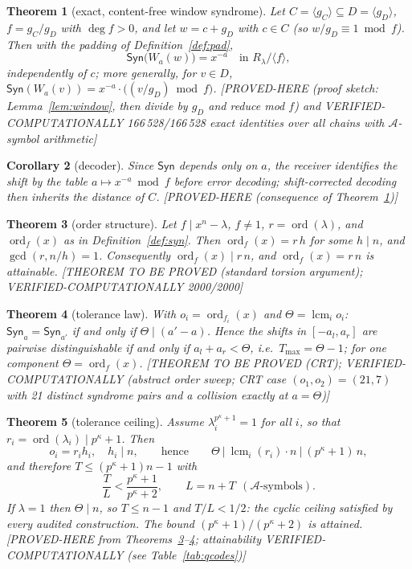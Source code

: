 \documentclass[11pt]{article}
\newtheorem{theorem}{Theorem}[section]
\newtheorem{corollary}[theorem]{Corollary}
\theoremstyle{definition}
\theoremstyle{remark}
\theoremstyle{plain}
\newcommand{\Aalg}{\mathcal{A}}
\newcommand{\Rlam}{R_{\lambda}}
\newcommand{\ord}{\operatorname{ord}}
\newcommand{\lcm}{\operatorname{lcm}}
\newcommand{\Tol}{T}
\newcommand{\Th}{\Theta}
\newcommand{\Syn}{\mathsf{Syn}}
\newcommand{\status}[1]{\textnormal{\footnotesize[#1]}}
\begin{document}
\begin{theorem}[exact, content-free window syndrome]\label{thm:synd}
Let $C=\langle g_C\rangle\subseteq D=\langle g_D\rangle$, $f=g_C/g_D$ with $\deg f>0$, and let
$w=c+g_D$ with $c\in C$ (so $w/g_D\equiv1\bmod f$). Then with the padding of
Definition~\ref{def:pad},
\[
\Syn\big(W_a(w)\big)=x^{-a}\quad\text{in }\Rlam/\langle f\rangle,
\]
independently of $c$; more generally, for $v\in D$,
$\Syn(W_a(v))=x^{-a}\cdot\big((v/g_D)\bmod f\big)$.
\status{PROVED-HERE (proof sketch: Lemma~\ref{lem:window}, then divide by $g_D$ and reduce
mod $f$) and VERIFIED-COMPUTATIONALLY 166\,528/166\,528 exact identities over all chains with
$\Aalg$-symbol arithmetic}
\end{theorem}

\begin{corollary}[decoder]\label{cor:decoder}
Since $\Syn$ depends only on $a$, the receiver identifies the shift by the table
$a\mapsto x^{-a}\bmod f$ before error decoding; shift-corrected decoding then inherits the
distance of $C$.
\status{PROVED-HERE (consequence of Theorem~\ref{thm:synd})}
\end{corollary}

\begin{theorem}[order structure]\label{thm:order}
Let $f\mid x^n-\lambda$, $f\ne1$, $r=\ord(\lambda)$, and $\ord_f(x)$ as in
Definition~\ref{def:syn}. Then $\ord_f(x)=r\,h$ for some $h\mid n$, and
$\gcd(r,n/h)=1$. Consequently $\ord_f(x)\mid r\,n$, and $\ord_f(x)=r\,n$ is attainable.
\status{THEOREM TO BE PROVED (standard torsion argument); VERIFIED-COMPUTATIONALLY 2000/2000}
\end{theorem}

\begin{theorem}[tolerance law]\label{thm:tolerance}
With $o_i=\ord_{f_i}(x)$ and $\Th=\lcm_i o_i$: $\Syn_a=\Syn_{a'}$ if and only if
$\Th\mid(a'-a)$. Hence the shifts in $[-a_l,a_r]$ are pairwise distinguishable if and only if
$a_l+a_r<\Th$, i.e.\ $\Tol_{\max}=\Th-1$; for one component $\Th=\ord_f(x)$.
\status{THEOREM TO BE PROVED (CRT); VERIFIED-COMPUTATIONALLY (abstract order sweep; CRT case
$(o_1,o_2)=(21,7)$ with 21 distinct syndrome pairs and a collision exactly at $a=\Th$)}
\end{theorem}

\begin{theorem}[tolerance ceiling]\label{thm:ceiling}
Assume $\lambda_i^{p^\kappa+1}=1$ for all $i$, so that $r_i=\ord(\lambda_i)\mid p^\kappa+1$.
Then
\[
o_i=r_ih_i,\quad h_i\mid n,
\qquad\text{hence}\qquad
\Th\ \Big|\ \lcm_i(r_i)\cdot n\ \Big|\ (p^\kappa+1)\,n,
\]
and therefore $\Tol\le(p^\kappa+1)n-1$ with
\[
\frac{\Tol}{L}<\frac{p^\kappa+1}{p^\kappa+2},\qquad L=n+\Tol\ \ (\Aalg\text{-symbols}).
\]
If $\lambda=1$ then $\Th\mid n$, so $\Tol\le n-1$ and $\Tol/L<1/2$: the \emph{cyclic ceiling}
satisfied by every audited construction. The bound $(p^\kappa+1)/(p^\kappa+2)$ is attained.
\status{PROVED-HERE from Theorems~\ref{thm:order}--\ref{thm:tolerance}; attainability
VERIFIED-COMPUTATIONALLY (see Table~\ref{tab:qcodes})}
\end{theorem}
\end{document}
